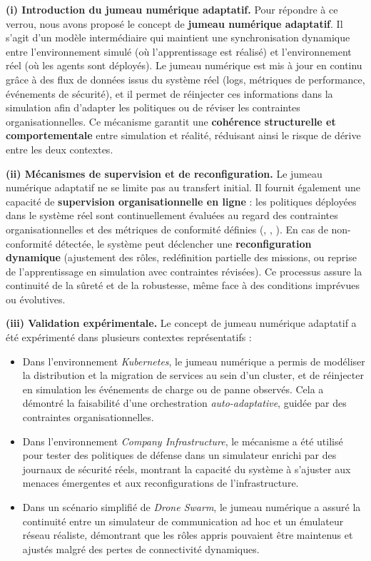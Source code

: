 \medskip
\noindent
\textbf{(i) Introduction du jumeau numérique adaptatif.}
Pour répondre à ce verrou, nous avons proposé le concept de \textbf{jumeau numérique adaptatif}.
Il s’agit d’un modèle intermédiaire qui maintient une synchronisation dynamique entre l’environnement simulé (où l’apprentissage est réalisé) et l’environnement réel (où les agents sont déployés).
Le jumeau numérique est mis à jour en continu grâce à des flux de données issus du système réel (logs, métriques de performance, événements de sécurité), et il permet de réinjecter ces informations dans la simulation afin d’adapter les politiques ou de réviser les contraintes organisationnelles.
Ce mécanisme garantit une \textbf{cohérence structurelle et comportementale} entre simulation et réalité, réduisant ainsi le risque de dérive entre les deux contextes.

\medskip
\noindent
\textbf{(ii) Mécanismes de supervision et de reconfiguration.}
Le jumeau numérique adaptatif ne se limite pas au transfert initial.
Il fournit également une capacité de \textbf{supervision organisationnelle en ligne} :
les politiques déployées dans le système réel sont continuellement évaluées au regard des contraintes organisationnelles et des métriques de conformité définies (, , ).
En cas de non-conformité détectée, le système peut déclencher une \textbf{reconfiguration dynamique} (ajustement des rôles, redéfinition partielle des missions, ou reprise de l’apprentissage en simulation avec contraintes révisées).
Ce processus assure la continuité de la sûreté et de la robustesse, même face à des conditions imprévues ou évolutives.

\medskip
\noindent
\textbf{(iii) Validation expérimentale.}
Le concept de jumeau numérique adaptatif a été expérimenté dans plusieurs contextes représentatifs :
\begin{itemize}
  \item Dans l’environnement \textit{Kubernetes}, le jumeau numérique a permis de modéliser la distribution et la migration de services au sein d’un cluster, et de réinjecter en simulation les événements de charge ou de panne observés. Cela a démontré la faisabilité d’une orchestration \textit{auto-adaptative}, guidée par des contraintes organisationnelles.
  \item Dans l’environnement \textit{Company Infrastructure}, le mécanisme a été utilisé pour tester des politiques de défense dans un simulateur enrichi par des journaux de sécurité réels, montrant la capacité du système à s’ajuster aux menaces émergentes et aux reconfigurations de l’infrastructure.
  \item Dans un scénario simplifié de \textit{Drone Swarm}, le jumeau numérique a assuré la continuité entre un simulateur de communication ad hoc et un émulateur réseau réaliste, démontrant que les rôles appris pouvaient être maintenus et ajustés malgré des pertes de connectivité dynamiques.
\end{itemize}

